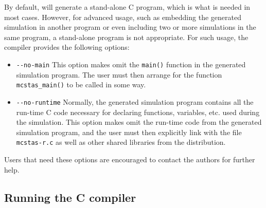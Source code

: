 By default, \MCS will generate a stand-alone C program, which is what is needed
in most cases. However, for advanced usage, such as embedding the generated
simulation in another program or even including two or more simulations in the
same program, a stand-alone program is not appropriate. For such usage, the
\MCS compiler provides the following options:
\begin{itemize}
\item \verb+--no-main+ This option makes \MCS omit the \verb+main()+ function
  in the generated simulation program. The user must then arrange for the
  function \verb+mcstas_main()+ to be called in some way.
\item \verb+--no-runtime+ Normally, the
  generated simulation program contains all the run-time C code necessary for
  declaring functions, variables, etc. used during the simulation.  This
  option makes \MCS omit the run-time code from the generated
  simulation program, and the user must then explicitly link with the file
  \verb+mcstas-r.c+ as well as other shared libraries from the \MCS{} distribution.
\end{itemize}
Users that need these options are encouraged to contact the authors for further
help.


\subsection{Running the C compiler}
\label{s:compile}

